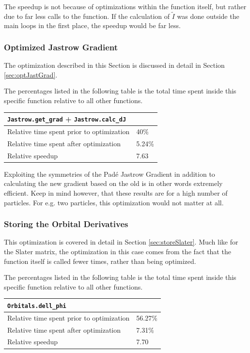 The speedup is not because of optimizations within the function itself, but rather due to far less calls to the function. If the calculation of $\tilde I$ was done outside the main loops in the first place, the speedup would be far less. 


\subsubsection{Optimized Jastrow Gradient}

The optimization described in this Section is discussed in detail in Section \ref{sec:optJastGrad}.

The percentages listed in the following table is the total time spent inside this specific function relative to all other functions. 

\begin{tabular}{ll}
 \verb+Jastrow.get_grad+ + \verb+Jastrow.calc_dJ+ & \\
 \hline\hline
 Relative time spent prior to optimization & 40\% \\
 Relative time spent after optimization    & 5.24\% \\
 \hline
 Relative speedup                          & 7.63
\end{tabular}

Exploiting the symmetries of the Padé Jastrow Gradient in addition to calculating the new gradient based on the old is in other words extremely efficient. Keep in mind however, that these results are for a high number of particles. For e.g. two particles, this optimization would not matter at all.

\subsubsection{Storing the Orbital Derivatives}

This optimization is covered in detail in Section \ref{sec:storeSlater}. Much like for the Slater matrix, the optimization in this case comes from the fact that the function itself is called fewer times, rather than being optimized.

The percentages listed in the following table is the total time spent inside this specific function relative to all other functions. 


\begin{tabular}{ll}
 \verb+Orbitals.dell_phi+ & \\
 \hline\hline
 Relative time spent prior to optimization & 56.27\% \\
 Relative time spent after optimization    & 7.31\% \\
 \hline
 Relative speedup                          & 7.70
\end{tabular}


